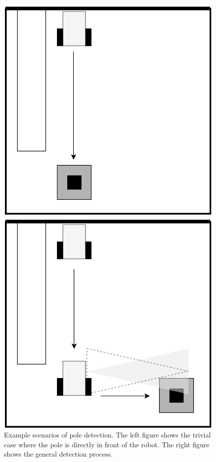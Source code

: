 \documentclass[ece]{uw-wkrpt}
\begin{document}
\begin{figure}[!tbp]
  \centering
  \captionsetup{justification=centering}

  \begin{minipage}[b]{0.4\textwidth}
    \includegraphics[width=\textwidth]{res/SA-example1}
  \end{minipage}
  \hfill
  \begin{minipage}[b]{0.4\textwidth}
    \includegraphics[width=\textwidth]{res/SA-example2}
  \end{minipage}
\caption[Example scenarios of pole detection]{Example scenarios of pole detection. The left figure shows the trivial case where the pole is directly in front of the robot. The right figure shows the general detection process.}
\label{fig:SAEX1}

\end{figure}
\end{document}
